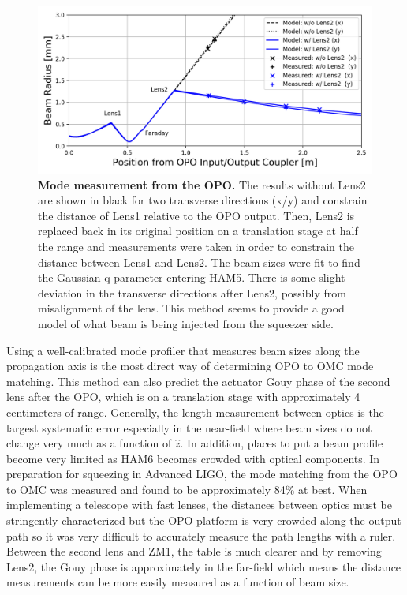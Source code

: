 	\begin{figure}[b!]
		\centering
		\includegraphics[width=0.8 \textwidth]{../Figures/OPO_to_ZM2_fit.png}
		\caption[Mode measurement from the OPO.]  
		{\textbf{Mode measurement from the OPO.}
			  The results without Lens2 are shown in black for two transverse directions (x/y) and constrain the distance of Lens1 relative to the OPO output.  Then, Lens2 is replaced back in its original position on a translation stage at half the range and measurements were taken in order to constrain the distance between Lens1 and Lens2.  The beam sizes were fit to find the Gaussian q-parameter entering HAM5. There is some slight deviation in the transverse directions after Lens2, possibly from misalignment of the lens.  This method seems to provide a good model of what beam is being injected from the squeezer side.
		}
		\label{fig:OPO_to_ZM2}
	\end{figure}
	
	Using a well-calibrated mode profiler that measures beam sizes along the propagation axis is the most direct way of determining OPO to OMC mode matching.  This method can also predict the actuator Gouy phase of the second lens after the OPO, which is on a translation stage with approximately 4 centimeters of range. Generally, the length measurement between optics is the largest systematic error especially in the near-field where beam sizes do not change very much as a function of $\hat{z}$.  In addition, places to put a beam profile become very limited as HAM6 becomes crowded with optical components.  In preparation for squeezing in Advanced LIGO, the mode matching from the OPO to OMC was measured and found to be approximately 84\% at best. When implementing a telescope with fast lenses, the distances between optics must be stringently characterized but the OPO platform is very crowded along the output path so it was very difficult to accurately measure the path lengths with a ruler.  Between the second lens and ZM1, the table is much clearer and by removing Lens2, the Gouy phase is approximately in the far-field which means the distance measurements can be more easily measured as a function of beam size.
	

